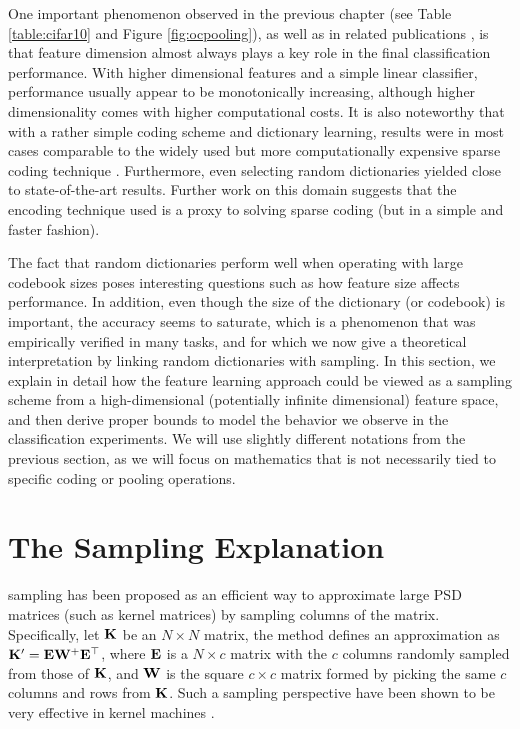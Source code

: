 
One important phenomenon observed in the previous chapter (see \eg Table \ref{table:cifar10} and Figure \ref{fig:ocpooling}), as well as in related publications \cite{coates2010aistats,coates2011icml}, is that feature dimension almost always plays a key role in the final classification performance. With higher dimensional features and a simple linear classifier, performance usually appear to be monotonically increasing, although higher dimensionality comes with higher computational costs. It is also noteworthy that with a rather simple coding scheme and dictionary learning, results were in most cases comparable to the widely used but more computationally expensive sparse coding technique \cite{coates2011icml}. Furthermore, even selecting random dictionaries yielded close to state-of-the-art results. Further work on this domain \cite{freitas} suggests that the encoding technique used is a proxy to solving sparse coding (but in a simple and faster fashion).

The fact that random dictionaries perform well when operating with large codebook sizes poses interesting questions such as how feature size affects performance. In addition, even though the size of the dictionary (or codebook) is important, the accuracy seems to saturate, which is a phenomenon that was empirically verified in many tasks, and for which we now give a theoretical interpretation by linking random dictionaries with \nystrom sampling. In this section, we explain in detail how the feature learning approach could be viewed as a \nystrom sampling scheme from a high-dimensional (potentially infinite dimensional) feature space, and then derive proper bounds to model the behavior we observe in the classification experiments. We will use slightly different notations from the previous section, as we will focus on mathematics that is not necessarily tied to specific coding or pooling operations.

\section{The \nystrom Sampling Explanation}
\nystrom sampling has been proposed as an efficient way to approximate large PSD matrices (such as kernel matrices) by sampling columns of the matrix. Specifically, let $\mathbf{K}$ be an $N\times N$ matrix, the \nystrom method defines an approximation as $\mathbf{K}' = \mathbf{E}\mathbf{W}^{+}\mathbf{E}^\top$, where $\mathbf{E}$ is a $N\times c$ matrix with the $c$ columns randomly sampled from those of $\mathbf{K}$, and $\mathbf{W}$ is the square $c\times c$ matrix formed by picking the same $c$ columns and rows from $\mathbf{K}$. Such a sampling perspective have been shown to be very effective in kernel machines \cite{zhang2008improved,cortes10,kumar2012sampling}.

